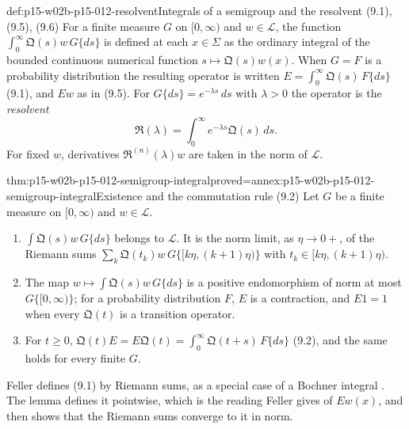 \begin{hbdefinition}{def:p15-w02b-p15-012-resolvent}{Integrals of a semigroup and the resolvent (9.1), (9.5), (9.6)}
For a finite measure \(G\) on \([0,\infty)\) and \(w\in\mathscr L\), the
function \(\int_0^\infty\mathfrak Q(s)w\,G\{ds\}\) is defined at each
\(x\in\Sigma\) as the ordinary integral of the bounded continuous numerical
function \(s\mapsto\mathfrak Q(s)w(x)\). When \(G=F\) is a probability
distribution the resulting operator is written
\(E=\int_0^\infty\mathfrak Q(s)\,F\{ds\}\) (9.1), and \(Ew\) as in (9.5). For
\(G\{ds\}=e^{-\lambda s}\,ds\) with \(\lambda>0\) the operator is the
\emph{resolvent}
\[
 \mathfrak R(\lambda)=\int_0^\infty e^{-\lambda s}\mathfrak Q(s)\,ds .
 \tag{9.6}
\]
For fixed \(w\), derivatives \(\mathfrak R^{(n)}(\lambda)w\) are taken in the
norm of \(\mathscr L\).
\end{hbdefinition}

\begin{hblemma}{thm:p15-w02b-p15-012-semigroup-integral}{proved=annex:p15-w02b-p15-012-semigroup-integral}{Existence and the commutation rule (9.2)}
Let \(G\) be a finite measure on \([0,\infty)\) and \(w\in\mathscr L\).
\begin{enumerate}
\item \(\int\mathfrak Q(s)w\,G\{ds\}\) belongs to \(\mathscr L\). It is the
      norm limit, as \(\eta\to0+\), of the Riemann sums
      \(\sum_k\mathfrak Q(t_k)w\,G\{[k\eta,(k+1)\eta)\}\) with
      \(t_k\in[k\eta,(k+1)\eta)\).
\item The map \(w\mapsto\int\mathfrak Q(s)w\,G\{ds\}\) is a positive
      endomorphism of norm at most \(G\{[0,\infty)\}\); for a probability
      distribution \(F\), \(E\) is a contraction, and \(E1=1\) when every
      \(\mathfrak Q(t)\) is a transition operator.
\item For \(t\geq0\),
      \(\mathfrak Q(t)E=E\mathfrak Q(t)=\int_0^\infty\mathfrak Q(t+s)\,F\{ds\}\)
      (9.2), and the same holds for every finite \(G\).
\end{enumerate}
\end{hblemma}

Feller defines (9.1) by Riemann sums, as a special case of a Bochner integral
\cite[vol.~II, XIII.9, p.~455]{Feller1971ProbabilityII}. The lemma defines it
pointwise, which is the reading Feller gives of \(Ew(x)\), and then shows that
the Riemann sums converge to it in norm.

